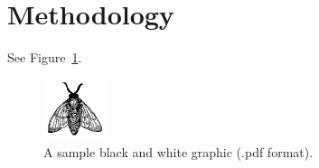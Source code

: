 \section{Methodology}
See Figure~\ref{fig:fly}.

\begin{figure}
\centering
\includegraphics{figures/fly}
\caption{A sample black and white graphic (.pdf format).}
\label{fig:fly}
\end{figure}